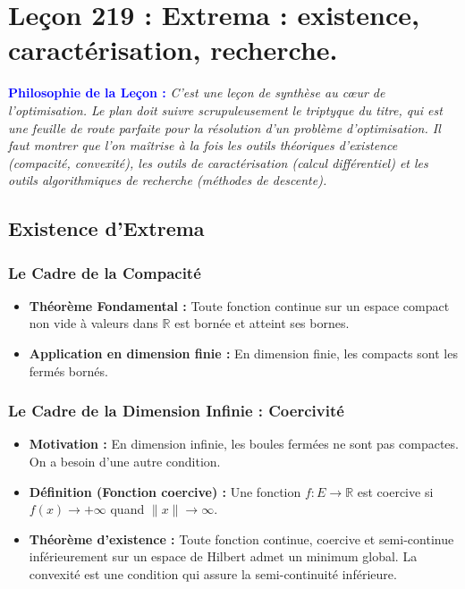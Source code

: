 \documentclass[12pt, a4paper, parskip=full]{report}
\theoremstyle{agregstyle}
\newenvironment{philosophie}
  {\par\medskip\noindent\begin{oframed}\noindent\textbf{\textcolor{blue}{Philosophie de la Leçon :}}\itshape}
  {\end{oframed}\par\medskip}
\begin{document}
\chapter{Leçon 219 : Extrema : existence, caractérisation, recherche.}

\begin{philosophie}
    C'est une leçon de synthèse au cœur de l'optimisation. Le plan doit suivre scrupuleusement le triptyque du titre, qui est une feuille de route parfaite pour la résolution d'un problème d'optimisation. Il faut montrer que l'on maîtrise à la fois les outils théoriques d'existence (compacité, convexité), les outils de caractérisation (calcul différentiel) et les outils algorithmiques de recherche (méthodes de descente).
\end{philosophie}

\section{Existence d'Extrema}
\subsection{Le Cadre de la Compacité}
\begin{itemize}
    \item \textbf{Théorème Fondamental :} Toute fonction continue sur un espace compact non vide à valeurs dans $\mathbb{R}$ est bornée et atteint ses bornes.
    \item \textbf{Application en dimension finie :} En dimension finie, les compacts sont les fermés bornés.
\end{itemize}
\subsection{Le Cadre de la Dimension Infinie : Coercivité}
\begin{itemize}
    \item \textbf{Motivation :} En dimension infinie, les boules fermées ne sont pas compactes. On a besoin d'une autre condition.
    \item \textbf{Définition (Fonction coercive) :} Une fonction $f: E \to \mathbb{R}$ est coercive si $f(x) \to +\infty$ quand $\|x\| \to \infty$.
    \item \textbf{Théorème d'existence :} Toute fonction continue, coercive et semi-continue inférieurement sur un espace de Hilbert admet un minimum global. La convexité est une condition qui assure la semi-continuité inférieure.
\end{itemize}
\end{document}
